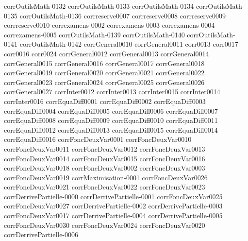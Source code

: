 {corrOutilsMath-0132}
{corrOutilsMath-0133}
{corrOutilsMath-0134}
{corrOutilsMath-0135}
{corrOutilsMath-0136}
{corrreserve0007}
{corrreserve0008}
{corrreserve0009}
{corrreserve0010}
{correxamens-0002}
{correxamens-0003}
{correxamens-0004}
{correxamens-0005}
{corrOutilsMath-0139}
{corrOutilsMath-0140}
{corrOutilsMath-0141}
{corrOutilsMath-0142}
{corrGeneral0010}
{corrGeneral0011}
{corr0013}
{corr0017}
{corr0016}
{corr0024}
{corrGeneral0012}
{corrGeneral0013}
{corrGeneral0014}
{corrGeneral0015}
{corrGeneral0016}
{corrGeneral0017}
{corrGeneral0018}
{corrGeneral0019}
{corrGeneral0020}
{corrGeneral0021}
{corrGeneral0022}
{corrGeneral0023}
{corrGeneral0024}
{corrGeneral0025}
{corrGeneral0026}
{corrGeneral0027}
{corrInter0012}
{corrInter0013}
{corrInter0015}
{corrInter0014}
{corrInter0016}
{corrEquaDiff0001}
{corrEquaDiff0002}
{corrEquaDiff0003}
{corrEquaDiff0004}
{corrEquaDiff0005}
{corrEquaDiff0006}
{corrEquaDiff0007}
{corrEquaDiff0008}
{corrEquaDiff0009}
{corrEquaDiff0010}
{corrEquaDiff0011}
{corrEquaDiff0012}
{corrEquaDiff0013}
{corrEquaDiff0015}
{corrEquaDiff0014}
{corrEquaDiff0016}
{corrFoncDeuxVar0001}
{corrFoncDeuxVar0010}
{corrFoncDeuxVar0011}
{corrFoncDeuxVar0012}
{corrFoncDeuxVar0013}
{corrFoncDeuxVar0014}
{corrFoncDeuxVar0015}
{corrFoncDeuxVar0016}
{corrFoncDeuxVar0018}
{corrFoncDeuxVar0002}
{corrFoncDeuxVar0003}
{corrFoncDeuxVar0019}
{corrMaximisation-0001}
{corrFoncDeuxVar0026}
{corrFoncDeuxVar0021}
{corrFoncDeuxVar0022}
{corrFoncDeuxVar0023}
{corrDerrivePartielle-0000}
{corrDerrivePartielle-0001}
{corrFoncDeuxVar0025}
{corrFoncDeuxVar0027}
{corrDerrivePartielle-0002}
{corrDerrivePartielle-0003}
{corrFoncDeuxVar0017}
{corrDerrivePartielle-0004}
{corrDerrivePartielle-0005}
{corrFoncDeuxVar0030}
{corrFoncDeuxVar0024}
{corrFoncDeuxVar0020}
{corrDerrivePartielle-0006}
